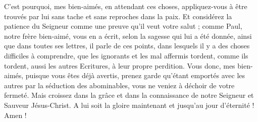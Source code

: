 \begin{multicols}{2}
C'est pourquoi, mes bien-aimés, en attendant ces choses, appliquez-vous à être trouvés par lui sans tache et sans reproches dans la paix.
Et considérez la patience du Seigneur comme une preuve qu'il veut votre salut ; comme Paul, notre frère bien-aimé, vous en a écrit, selon la sagesse qui lui a été donnée,
ainsi que dans toutes ses lettres, il parle de ces points, dans lesquels il y a des choses difficiles à comprendre, que les ignorants et les mal affermis tordent, comme ils tordent, aussi les autres Ecritures, à leur propre perdition.
Vous donc, mes bien-aimés, puisque vous êtes déjà avertis, prenez garde qu'étant emportés avec les autres par la séduction des abominables, vous ne veniez à déchoir de votre fermeté.
Mais croissez dans la grâce et dans la connaissance de notre Seigneur et Sauveur Jésus-Christ. A lui soit la gloire maintenant et jusqu'au jour d'éternité ! Amen !
\PPE{}
\end{multicols}
